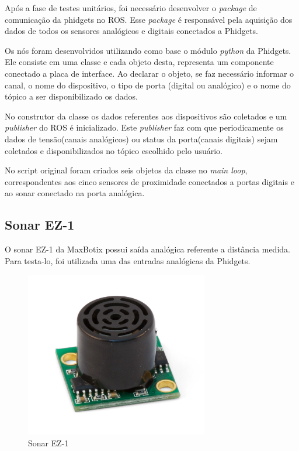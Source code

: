      Após a fase de testes unitários, foi necessário desenvolver o \textit{package} de comunicação da phidgets no ROS. Esse \textit{package} é responsável pela aquisição dos dados de todos os sensores analógicos e digitais conectados a Phidgets.
     
     Os nós foram desenvolvidos utilizando como base o módulo \textit{python} da Phidgets. Ele consiste em uma classe e cada objeto desta, representa um componente conectado a placa de interface. Ao declarar o objeto, se faz necessário informar o canal, o nome do dispositivo, o tipo de porta (digital ou analógico) e o nome do tópico a ser disponibilizado os dados. 
     
     No construtor da classe os dados referentes aos dispositivos são coletados e um \textit{publisher} do ROS é inicializado. Este  \textit{publisher} faz com que periodicamente os dados de tensão(canais analógicos) ou status da porta(canais digitais) sejam coletados e disponibilizados no tópico escolhido pelo usuário. 
     
     No script original foram criados seis objetos da classe no \textit{main loop}, correspondentes aos cinco sensores de proximidade conectados a portas digitais e ao sonar conectado na porta analógica.

		
	\subsection{Sonar EZ-1}
		O sonar EZ-1 da MaxBotix possui saída analógica referente a distância medida. Para testa-lo, foi utilizada uma das entradas analógicas da Phidgets.
		
		
		\begin{figure}[!ht]
		   \centering
		   \includegraphics[width=8cm]{Figures/ez1.jpg}
		   \caption{Sonar EZ-1}
		   \label{fig:ez1}
		\end{figure}
		
